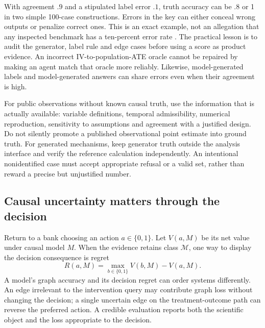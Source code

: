 With agreement $.9$ and a stipulated label error $.1$, truth accuracy can be
$.8$ or 1 in two simple 100-case constructions. Errors in the key can either
conceal wrong outputs or penalize correct ones. This is an exact example, not
an allegation that any inspected benchmark has a ten-percent error rate
\cite{exec13_frontier_exact}. The practical lesson is to audit the generator,
label rule and edge cases before using a score as product evidence. An
incorrect IV-to-population-ATE oracle cannot be repaired by making an agent
match that oracle more reliably. Likewise, model-generated labels and
model-generated answers can share errors even when their agreement is high.

For public observations without known causal truth, use the information that
is actually available: variable definitions, temporal admissibility, numerical
reproduction, sensitivity to assumptions and agreement with a justified design.
Do not silently promote a published observational point estimate into ground
truth. For generated mechanisms, keep generator truth outside the analysis
interface and verify the reference calculation independently. An intentional
nonidentified case must accept appropriate refusal or a valid set, rather than
reward a precise but unjustified number.

\subsection{Causal uncertainty matters through the decision}

Return to a bank choosing an action $a\in\{0,1\}$. Let $V(a,M)$ be its net
value under causal model $M$. When the evidence retains class $\mathcal M$,
one way to display the decision consequence is regret
\begin{equation}
 R(a,M)=\max_{b\in\{0,1\}}V(b,M)-V(a,M).
 \label{exec13:frontier-regret}
\end{equation}
A model's graph accuracy and its decision regret can order systems differently.
An edge irrelevant to the intervention query may contribute graph loss without
changing the decision; a single uncertain edge on the treatment-outcome path
can reverse the preferred action. A credible evaluation reports both the
scientific object and the loss appropriate to the decision.

